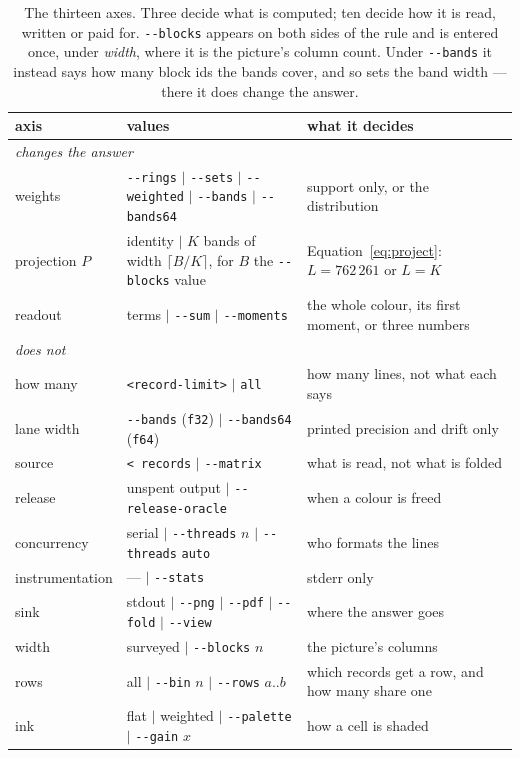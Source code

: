 \documentclass[11pt,a4paper]{article}
\newcommand{\flag}[1]{\texttt{-{}-#1}}
\begin{document}
\begin{table}[tp]
\centering\small
\begin{tabular}{lp{}p{}}
\toprule
axis & values & what it decides \\
\midrule
\multicolumn{3}{l}{\emph{changes the answer}} \\
weights     & \flag{rings} $|$ \flag{sets} $|$ \flag{weighted} $|$ \flag{bands} $|$ \flag{bands64} & support only, or the distribution \\
projection $P$ & identity $|$ $K$ bands of width $\lceil B/K \rceil$, for $B$ the \flag{blocks} value & Equation~\eqref{eq:project}: $L=762\,261$ or $L=K$ \\
readout     & terms $|$ \flag{sum} $|$ \flag{moments} & the whole colour, its first moment, or three numbers \\
\midrule
\multicolumn{3}{l}{\emph{does not}} \\
how many    & \texttt{<record-limit>} $|$ \texttt{all} & how many lines, not what each says \\
lane width  & \flag{bands} (\texttt{f32}) $|$ \flag{bands64} (\texttt{f64}) & printed precision and drift only \\
source      & \texttt{< records} $|$ \flag{matrix} & what is read, not what is folded \\
release     & unspent output $|$ \flag{release-oracle} & when a colour is freed \\
concurrency & serial $|$ \flag{threads} $n$ $|$ \flag{threads} \texttt{auto} & who formats the lines \\
instrumentation & --- $|$ \flag{stats} & stderr only \\
sink        & stdout $|$ \flag{png} $|$ \flag{pdf} $|$ \flag{fold} $|$ \flag{view} & where the answer goes \\
width       & surveyed $|$ \flag{blocks} $n$ & the picture's columns \\
rows        & all $|$ \flag{bin} $n$ $|$ \flag{rows} $a..b$ & which records get a row, and how many share one \\
ink         & flat $|$ weighted $|$ \flag{palette} $|$ \flag{gain} $x$ & how a cell is shaded \\
\bottomrule
\end{tabular}
\caption{The thirteen axes. Three decide what is computed; ten decide how it is
read, written or paid for. \flag{blocks} appears on both sides of the rule and
is entered once, under \emph{width}, where it is the picture's column count.
Under \flag{bands} it instead says how many block ids the bands cover, and so
sets the band width --- there it does change the answer.}
\label{tab:axes}
\end{table}
\end{document}
